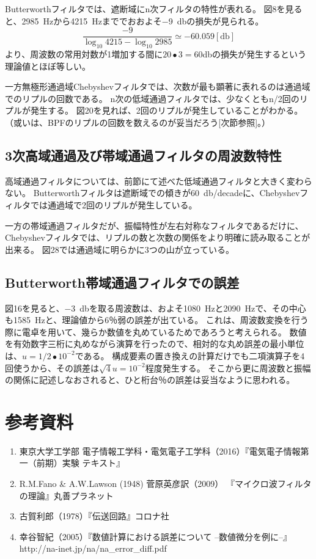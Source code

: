 \documentclass[10pt,a4j,dvipdfmx]{jsarticle}
\makeatletter
\let\@oldsec\section
\let\@oldsubsec\subsection
\renewcommand{\section}[1]{\@oldsec{#1}\vspace{-5pt}{\color{TealBlue}\hrule height 0.6pt \hfill}\par}
\renewcommand{\subsection}[1]{\vspace{-7pt}\@oldsubsec{#1}}
\makeatother
\begin{document}
Butterworthフィルタでは、遮断域にn次フィルタの特性が表れる。
図8を見ると、\SI{2985}{\hertz}から\SI{4215}{\hertz}まででおおよそ\SI{-9}{\decibel}の損失が見られる。
\begin{equation}
\frac{-9}{\log_{10}4215 - \log_{10}2985} \simeq -60.059[\si{\decibel}]
\end{equation}
より、周波数の常用対数が1増加する間に$20\bullet3 = 60$\si{\decibel}の損失が発生するという理論値とほぼ等しい。

一方無極形通過域Chebyshevフィルタでは、次数が最も顕著に表れるのは通過域でのリプルの回数である。
n次の低域通過フィルタでは、少なくともn/2回のリプルが発生する。
図20を見れば、2回のリプルが発生していることがわかる。
（或いは、BPFのリプルの回数を数えるのが妥当だろう[次節参照]。）

\subsection{3次高域通過及び帯域通過フィルタの周波数特性}
高域通過フィルタについては、前節にて述べた低域通過フィルタと大きく変わらない。
Butterworthフィルタは遮断域での傾きが\SI{60}{\decibel}/decadeに、Chebyshevフィルタでは通過域で2回のリプルが発生している。

一方の帯域通過フィルタだが、振幅特性が左右対称なフィルタであるだけに、Chebyshevフィルタでは、リプルの数と次数の関係をより明確に読み取ることが出来る。
図28では通過域に明らかに3つの山が立っている。

\subsection{Butterworth帯域通過フィルタでの誤差}
図16を見ると、\SI{-3}{\decibel}を取る周波数は、およそ\SI{1080}{\hertz}と\SI{2090}{\hertz}で、その中心も\SI{1585}{\hertz}と、理論値から6％弱の誤差が出ている。
これは、周波数変換を行う際に電卓を用いて、幾らか数値を丸めているためであろうと考えられる。
数値を有効数字三桁に丸めながら演算を行ったので、相対的な丸め誤差の最小単位は、$ u = 1/2\bullet10^{-2}$である。
構成要素の置き換えの計算だけでも二項演算子を4回使うから、その誤差は$\sqrt{4}u = 10^{-2}$程度発生する。
そこから更に周波数と振幅の関係に記述しなおされると、ひと桁台％の誤差は妥当なように思われる。

\section{参考資料}
\begin{enumerate}
\item 東京大学工学部 電子情報工学科・電気電子工学科（2016）『電気電子情報第一（前期）実験 テキスト』
\item R.M.Fano \& A.W.Lawson (1948) 菅原英彦訳（2009） 『マイクロ波フィルタの理論』丸善プラネット
\item 古賀利郎（1978）『伝送回路』コロナ社
\item 幸谷智紀（2005）『数値計算における誤差について –数値微分を例に–』http://na-inet.jp/na/na\_error\_diff.pdf

\end{enumerate}
\end{document}

